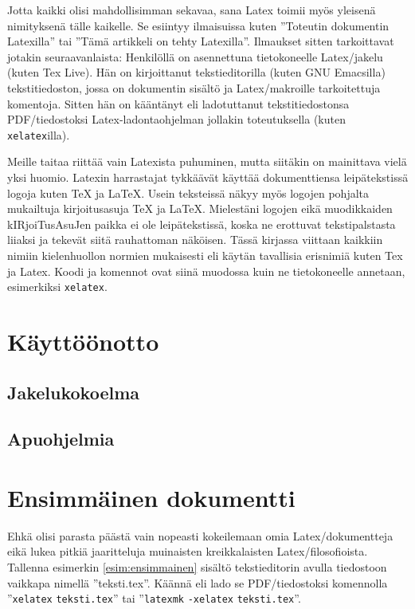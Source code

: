\documentclass[a4paper,10pt,notitlepage,oneside]{book}
\newcommand{\koodi}[1]{\mbox{\texttt{#1}}}
\begin{document}
Jotta kaikki olisi mahdollisimman sekavaa, sana Latex toimii myös
yleisenä nimityksenä tälle kaikelle. Se esiintyy ilmaisuissa kuten
''Toteutin dokumentin Latexilla'' tai ''Tämä artikkeli on tehty
Latexilla''. Ilmaukset sitten tarkoittavat jotakin seuraavanlaista:
Henkilöllä on asennettuna tietokoneelle Latex\-/jakelu (kuten Tex Live).
Hän on kirjoittanut teksti\-editorilla (kuten GNU Emacsilla)
tekstitiedoston, jossa on dokumentin sisältö ja Latex\-/makroille
tarkoitettuja komentoja. Sitten hän on kääntänyt eli ladotuttanut
tekstitiedostonsa PDF\-/tiedostoksi Latex-la\-don\-ta\-oh\-jel\-man
jollakin toteutuksella (kuten \koodi{xelatex}illa).

Meille \marginpar{\Large\LaTeX} taitaa riittää vain Latexista puhuminen,
mutta siitäkin on mainittava vielä yksi huomio. Latexin harrastajat
tykkäävät käyttää dokumenttiensa leipätekstissä logoja kuten \TeX{} ja
\LaTeX{}. Usein teksteissä näkyy myös logojen pohjalta mukailtuja
kirjoitus\-asuja TeX ja LaTeX. Mielestäni logojen eikä muodikkaiden
kIRjoiTus\-AsuJen paikka ei ole leipätekstissä, koska ne erottuvat
tekstipalstasta liiaksi ja tekevät siitä rauhattoman näköisen. Tässä
kirjassa viittaan kaikkiin nimiin kielenhuollon normien mukaisesti eli
käytän tavallisia erisnimiä kuten Tex ja Latex. Koodi ja komennot ovat
siinä muodossa kuin ne tietokoneelle annetaan, esimerkiksi
\koodi{xelatex}.

\section{Käyttöönotto}
\subsection{Jakelukokoelma}
\subsection{Apuohjelmia}

%

\section{Ensimmäinen dokumentti}

Ehkä olisi parasta päästä vain nopeasti kokeilemaan omia
Latex\-/dokumentteja eikä lukea pitkiä jaaritteluja muinaisten
kreikkalaisten Latex\-/filosofioista. Tallenna esimerkin
\ref{esim:ensimmainen} sisältö teksti\-editorin avulla tiedostoon
vaikkapa nimellä ''teksti.tex''. Käännä eli lado se PDF\-/tiedostoksi
komennolla ''\koodi{xelatex} \koodi{teksti.tex}'' tai ''\koodi{latexmk}
\koodi{-xelatex} \koodi{teksti.tex}''.
\end{document}
